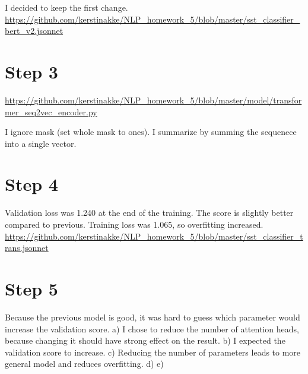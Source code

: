 \documentclass[11pt]{article} %
\begin{document}
I decided to keep the first change. 
\href{https://github.com/kerstinakke/NLP_homework_5/blob/master/sst_classifier_bert\_v2.jsonnet}{https://github.com/kerstinakke/NLP\_homework\_5/blob/master/sst\_classifier\_bert\_v2.jsonnet}

\section*{Step 3}
\href{https://github.com/kerstinakke/NLP_homework_5/blob/master/model/transformer_seq2vec_encoder.py}{https://github.com/kerstinakke/NLP\_homework\_5/blob/master/model/transformer\_seq2vec\_encoder.py}

I ignore mask (set whole mask to ones). I summarize by summing the sequenece into a single vector.

\section*{Step 4}

Validation loss was 1.240 at the end of the training. The score is slightly better compared to previous. Training loss was 1.065, so overfitting increased.  
\href{https://github.com/kerstinakke/NLP_homework_5/blob/master/sst_classifier_trans.jsonnet}{https://github.com/kerstinakke/NLP\_homework\_5/blob/master/sst\_classifier\_trans.jsonnet}
 
\section*{Step 5}

Because the previous model is good, it was hard to guess which parameter would increase the validation score.
a) I chose to reduce the number of attention heads, because changing it should have strong effect on the result. 
b) I expected the validation score to increase.
c) Reducing the number of parameters leads to more general model and reduces overfitting.
d)  
e)
\end{document}
